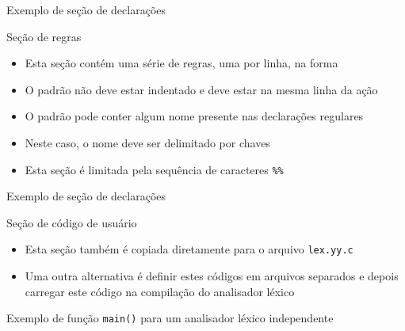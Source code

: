 \begin{frame}[fragile]{Exemplo de seção de declarações}
\end{frame}

\begin{frame}[fragile]{Seção de regras}

    \begin{itemize}
        \item Esta seção contém uma série de regras, uma por linha, na forma

        \item O padrão não deve estar indentado e deve estar na mesma linha da ação

        \item O padrão pode conter algum nome presente nas declarações regulares

        \item Neste caso, o nome deve ser delimitado por chaves

        \item Esta seção é limitada pela sequência de caracteres \verb|%%|
    \end{itemize}

\end{frame}

\begin{frame}[fragile]{Exemplo de seção de declarações}
\end{frame}

\begin{frame}[fragile]{Seção de código de usuário}

    \begin{itemize}
        \item Esta seção também é copiada diretamente para o arquivo \texttt{lex.yy.c}

        \item Uma outra alternativa é definir estes códigos em arquivos separados e depois carregar este código na compilação do analisador léxico

    \end{itemize}

\end{frame}

\begin{frame}[fragile]{Exemplo de função {\tt main()} para um analisador léxico independente}


\end{frame}
